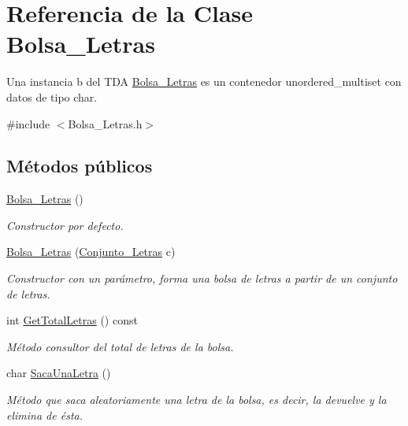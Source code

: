 \hypertarget{classBolsa__Letras}{}\section{Referencia de la Clase Bolsa\+\_\+\+Letras}
\label{classBolsa__Letras}


Una instancia b del T\+DA \hyperlink{classBolsa__Letras}{Bolsa\+\_\+\+Letras} es un contenedor unordered\+\_\+multiset con datos de tipo char.  




{\ttfamily \#include $<$Bolsa\+\_\+\+Letras.\+h$>$}

\subsection*{Métodos públicos}
\begin{DoxyCompactItemize}
\item 
\mbox{\label{classBolsa__Letras_aac3edc3708e10d1decee5575a0cfd543}} 
\hyperlink{classBolsa__Letras_aac3edc3708e10d1decee5575a0cfd543}{Bolsa\+\_\+\+Letras} ()
\begin{DoxyCompactList}\small\item\em Constructor por defecto. \end{DoxyCompactList}\item 
\hyperlink{classBolsa__Letras_a52db817ae18cc5dd9339c6bc6a1a88b3}{Bolsa\+\_\+\+Letras} (\hyperlink{classConjunto__Letras}{Conjunto\+\_\+\+Letras} c)
\begin{DoxyCompactList}\small\item\em Constructor con un parámetro, forma una bolsa de letras a partir de un conjunto de letras. \end{DoxyCompactList}\item 
int \hyperlink{classBolsa__Letras_a25bbc49ca79e8182a2adc9243b145655}{Get\+Total\+Letras} () const
\begin{DoxyCompactList}\small\item\em Método consultor del total de letras de la bolsa. \end{DoxyCompactList}\item 
char \hyperlink{classBolsa__Letras_aa5540422db02a4bad84498ea5820e7f8}{Saca\+Una\+Letra} ()
\begin{DoxyCompactList}\small\item\em Método que saca aleatoriamente una letra de la bolsa, es decir, la devuelve y la elimina de ésta. \end{DoxyCompactList}\end{DoxyCompactItemize}
